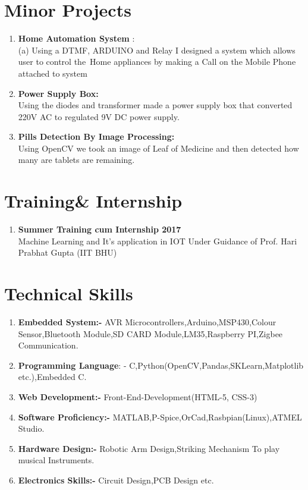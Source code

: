 \documentclass[12pt]{article}
\begin{document}
\section*{\textbf{Minor Projects}}
\begin{enumerate}
  \item{\textbf{Home Automation System}} :\\(a) Using a DTMF, ARDUINO and Relay I designed a system
which allows user to control the\ Home appliances by making a Call on the Mobile
Phone attached to system
\item {\textbf{Power Supply Box:}}\\ Using the diodes and transformer made a power supply box that converted 220V AC to regulated 9V DC power supply.

\item {\textbf{Pills Detection By Image Processing:}}\\ Using OpenCV we took an image of Leaf of Medicine and then detected how many are tablets are remaining.
\end{enumerate}
\section*{\textbf{Training\& Internship}}
\begin{enumerate}
\item
\textbf{Summer Training cum Internship 2017 }\\Machine Learning and It's application in IOT  Under Guidance of Prof. Hari Prabhat Gupta (IIT BHU)
\end{enumerate}

\section*{\textbf{Technical Skills}}
\begin{enumerate}
  \item\textbf{Embedded System:-} AVR Microcontrollers,Arduino,MSP430,Colour Sensor,Bluetooth Module,SD CARD Module,LM35,Raspberry PI,Zigbee Communication.
  \item \textbf{Programming Language}: - C,Python(OpenCV,Pandas,SKLearn,Matplotlib etc.),Embedded C. 
  \item \textbf{ Web Development:-} Front-End-Development(HTML-5, CSS-3)
  \item\textbf{ Software Proficiency:-} MATLAB,P-Spice,OrCad,Rasbpian(Linux),ATMEL Studio.
  \item\textbf{ Hardware Design:-}
  Robotic Arm Design,Striking Mechanism To play musical Instruments.
  \item\textbf{ Electronics Skills:-}
  Circuit Design,PCB Design etc.
\end{enumerate}
\end{document}
